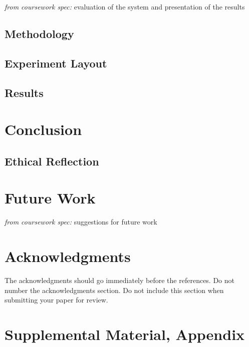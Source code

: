 \documentclass[hidelinks, 11pt]{article}
\begin{document}
\textit{from coursework spec:} evaluation of the system and presentation of the results

\subsection{Methodology}
\label{subsec:methodology}

\subsection{Experiment Layout}
\label{subsec:experiment_layout}

\subsection{Results}
\label{subsec:results}

\section{Conclusion}
\label{sec:conclusion}

\subsection{Ethical Reflection}
\label{subsec:ethics}

\section{Future Work}
\label{sec:future_work}

\textit{from coursework spec:} suggestions for future work


\section*{Acknowledgments}
\label{sec:acknowledgments}

The acknowledgments should go immediately before the references.  Do
not number the acknowledgments section. Do not include this section
when submitting your paper for review.

%
%



\appendix

\section{Supplemental Material, Appendix}
\label{sec:supplemental}
\end{document}
